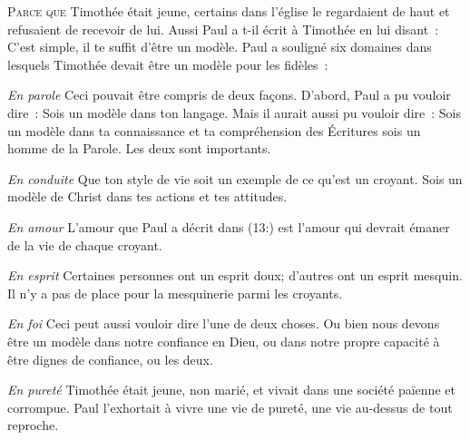 \lettrine{P}{arce que} Timothée était jeune, certains dans l'église
 le regardaient de haut et refusaient de recevoir de lui.
 Aussi Paul a t-il écrit à Timothée en lui disant~: 
 \og C'est simple, il te suffit d'être un modèle. \fg{}
 Paul a souligné six domaines dans lesquels Timothée
 devait être un modèle pour les fidèles~:


\emph{En parole} \ocadr
 Ceci pouvait être compris de deux façons.
 D'abord, Paul a pu vouloir dire~: 
 \og Sois un modèle dans ton langage. \fg{}
 Mais il aurait aussi pu vouloir dire~: 
 \og Sois un modèle dans ta connaissance et ta compréhension des Écritures
 \ocadr sois un homme de la Parole. \fg{} Les deux sont importants.

\emph{En conduite} \ocadr
 Que ton style de vie soit un exemple de ce qu'est un croyant.
 Sois un modèle de Christ dans tes actions et tes attitudes.

\emph{En amour} \ocadr
 L'amour que Paul a décrit dans (13:) 
 est l'amour qui devrait émaner de la vie de chaque croyant.

\emph{En esprit} \ocadr
 Certaines personnes ont un esprit doux; d'autres ont un esprit mesquin.
 Il n'y a pas de place pour la mesquinerie parmi les croyants.

\emph{En foi} \ocadr
 Ceci peut aussi vouloir dire l'une de deux choses.
 Ou bien nous devons être un modèle dans notre confiance en Dieu,
 ou dans notre propre capacité à être dignes de confiance, ou les deux.

\emph{En pureté} \ocadr
 Timothée était jeune, non marié, et vivait dans une société païenne
 et corrompue. Paul l'exhortait à vivre une vie de pureté,
 une vie au-dessus de tout reproche.



\dvrule





